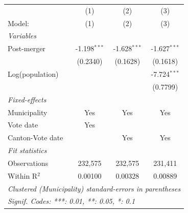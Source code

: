 \begin{tabular}{lccc}
   \tabularnewline \midrule \midrule
                    & (1)            & (2)            & (3) \\   
   Model:           & (1)            & (2)            & (3)\\  
   \midrule
   \emph{Variables}\\
   Post-merger      & -1.198$^{***}$ & -1.628$^{***}$ & -1.627$^{***}$\\   
                    & (0.2340)       & (0.1628)       & (0.1618)\\   
   Log(population)  &                &                & -7.724$^{***}$\\   
                    &                &                & (0.7799)\\   
   \midrule
   \emph{Fixed-effects}\\
   Municipality     & Yes            & Yes            & Yes\\  
   Vote date        & Yes            &                & \\  
   Canton-Vote date &                & Yes            & Yes\\  
   \midrule
   \emph{Fit statistics}\\
   Observations     & 232,575        & 232,575        & 231,411\\  
   Within R$^2$     & 0.00100        & 0.00328        & 0.00889\\  
   \midrule \midrule
   \multicolumn{4}{l}{\emph{Clustered (Municipality) standard-errors in parentheses}}\\
   \multicolumn{4}{l}{\emph{Signif. Codes: ***: 0.01, **: 0.05, *: 0.1}}\\
\end{tabular}
